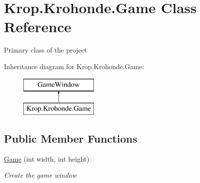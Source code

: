 \hypertarget{class_krop_1_1_krohonde_1_1_game}{}\section{Krop.\+Krohonde.\+Game Class Reference}
\label{class_krop_1_1_krohonde_1_1_game}


Primary class of the project  


Inheritance diagram for Krop.\+Krohonde.\+Game\+:\begin{figure}[H]
\begin{center}
\leavevmode
\includegraphics[height=2.000000cm]{class_krop_1_1_krohonde_1_1_game}
\end{center}
\end{figure}
\subsection*{Public Member Functions}
\begin{DoxyCompactItemize}
\item 
\mbox{\hyperlink{class_krop_1_1_krohonde_1_1_game_a99b4f31e791c00af369068b6a17482de}{Game}} (int width, int height)
\begin{DoxyCompactList}\small\item\em Create the game window \end{DoxyCompactList}\end{DoxyCompactItemize}

